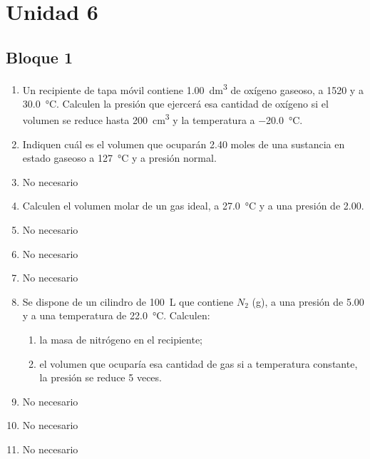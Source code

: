 \documentclass[../Práctica.root.tex]{subfiles}
\begin{document}
\section{Unidad 6}
\subsection{Bloque 1}
\begin{enumerate}
    \item Un recipiente de tapa móvil contiene \SI{1,00}{\deci\m\cubed} de oxígeno gaseoso, a \SI{1520}{\torr} y a
          \SI{30,0}{\celsius}. Calculen la presión que ejercerá esa cantidad de oxígeno si el volumen se reduce
          hasta \SI{200}{\centi\m\cubed} y la temperatura a \SI{-20,0}{\celsius}.

    \item Indiquen cuál es el volumen que ocuparán \num{2,40} moles de una sustancia en estado gaseoso a
          \SI{127}{\celsius} y a presión normal.

    \item No necesario

    \item Calculen el volumen molar de un gas ideal, a \SI{27,0}{\celsius} y a una presión de \SI{2,00}{\atm}.

    \item No necesario

    \item No necesario

    \item No necesario

    \item Se dispone de un cilindro de \SI{100}{\liter} que contiene $N_2$ (g), a una presión de \SI{5,00}{\atm} y a una
          temperatura de \SI{22,0}{\celsius}. Calculen:
          \begin{enumerate}
              \item la masa de nitrógeno en el recipiente;
              \item el volumen que ocuparía esa cantidad de gas si a temperatura constante, la presión se
                    reduce \num{5} veces.
          \end{enumerate}

    \item No necesario

    \item No necesario

    \item No necesario


\end{enumerate}
\end{document}
